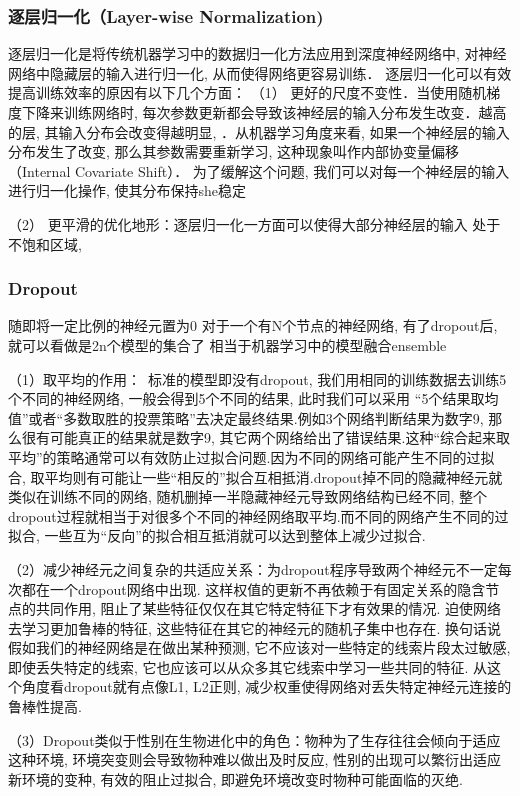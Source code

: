 \subsubsection{逐层归一化（Layer-wise Normalization)}
逐层归一化是将传统机器学习中的数据归一化方法应用到深度神经网络中, 对神经网络中隐藏层的输入进行归一化, 从而使得网络更容易训练．
逐层归一化可以有效提高训练效率的原因有以下几个方面：
（1） 更好的尺度不变性．当使用随机梯度下降来训练网络时, 每次参数更新都会导致该神经层的输入分布发生改变．越高的层, 其输入分布会改变得越明显, ．从机器学习角度来看, 如果一个神经层的输入分布发生了改变, 那么其参数需要重新学习, 这种现象叫作内部协变量偏移（Internal Covariate Shift）． 
为了缓解这个问题, 我们可以对每一个神经层的输入进行归一化操作, 使其分布保持she稳定

（2） 更平滑的优化地形：逐层归一化一方面可以使得大部分神经层的输入
处于不饱和区域, 
\subsubsection{Dropout}
随即将一定比例的神经元置为0
对于一个有N个节点的神经网络, 有了dropout后, 就可以看做是2n个模型的集合了
相当于机器学习中的模型融合ensemble

（1）取平均的作用： 标准的模型即没有dropout, 我们用相同的训练数据去训练5个不同的神经网络, 一般会得到5个不同的结果, 此时我们可以采用 “5个结果取均值”或者“多数取胜的投票策略”去决定最终结果.例如3个网络判断结果为数字9, 那么很有可能真正的结果就是数字9, 其它两个网络给出了错误结果.这种“综合起来取平均”的策略通常可以有效防止过拟合问题.因为不同的网络可能产生不同的过拟合, 取平均则有可能让一些“相反的”拟合互相抵消.dropout掉不同的隐藏神经元就类似在训练不同的网络, 随机删掉一半隐藏神经元导致网络结构已经不同, 整个dropout过程就相当于对很多个不同的神经网络取平均.而不同的网络产生不同的过拟合, 一些互为“反向”的拟合相互抵消就可以达到整体上减少过拟合.

（2）减少神经元之间复杂的共适应关系：为dropout程序导致两个神经元不一定每次都在一个dropout网络中出现. 这样权值的更新不再依赖于有固定关系的隐含节点的共同作用, 阻止了某些特征仅仅在其它特定特征下才有效果的情况. 迫使网络去学习更加鲁棒的特征, 这些特征在其它的神经元的随机子集中也存在. 换句话说假如我们的神经网络是在做出某种预测, 它不应该对一些特定的线索片段太过敏感, 即使丢失特定的线索, 它也应该可以从众多其它线索中学习一些共同的特征. 从这个角度看dropout就有点像L1, L2正则, 减少权重使得网络对丢失特定神经元连接的鲁棒性提高. 

（3）Dropout类似于性别在生物进化中的角色：物种为了生存往往会倾向于适应这种环境, 环境突变则会导致物种难以做出及时反应, 性别的出现可以繁衍出适应新环境的变种, 有效的阻止过拟合, 即避免环境改变时物种可能面临的灭绝.  

